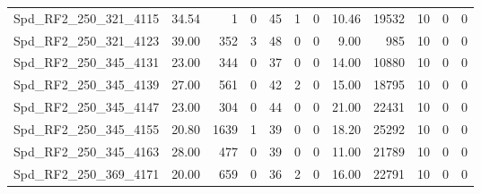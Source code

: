\begin{longtable}[c]{@{}lrrrrrrrrrrr@{}}
Spd\_RF2\_250\_321\_4115     & 34.54                  & 1                       & 0                       & 45                     & 1                       & 0                       & 10.46                   & 19532                    & 10                       & 0                        & 0                        \\
Spd\_RF2\_250\_321\_4123     & 39.00                  & 352                     & 3                       & 48                     & 0                       & 0                       & 9.00                    & 985                      & 10                       & 0                        & 0                        \\
Spd\_RF2\_250\_345\_4131     & 23.00                  & 344                     & 0                       & 37                     & 0                       & 0                       & 14.00                   & 10880                    & 10                       & 0                        & 0                        \\
Spd\_RF2\_250\_345\_4139     & 27.00                  & 561                     & 0                       & 42                     & 2                       & 0                       & 15.00                   & 18795                    & 10                       & 0                        & 0                        \\
Spd\_RF2\_250\_345\_4147     & 23.00                  & 304                     & 0                       & 44                     & 0                       & 0                       & 21.00                   & 22431                    & 10                       & 0                        & 0                        \\
Spd\_RF2\_250\_345\_4155     & 20.80                  & 1639                    & 1                       & 39                     & 0                       & 0                       & 18.20                   & 25292                    & 10                       & 0                        & 0                        \\
Spd\_RF2\_250\_345\_4163     & 28.00                  & 477                     & 0                       & 39                     & 0                       & 0                       & 11.00                   & 21789                    & 10                       & 0                        & 0                        \\
Spd\_RF2\_250\_369\_4171     & 20.00                  & 659                     & 0                       & 36                     & 2                       & 0                       & 16.00                   & 22791                    & 10                       & 0                        & 0                        \\

\end{longtable}
